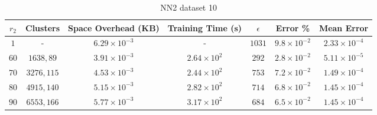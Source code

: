 \par\null\par
\par\null\par

\begin{adjustwidth}{-1cm}{}
\begin{table}
\caption{NN2 dataset 10}\label{ws210}
\begin{tabular}{ccccccc}
\hline
\toprule
$r_2$ & Clusters & Space Overhead (KB) & Training Time (s) & $\epsilon$ & Error \% & Mean Error\\
\midrule
$1$ & - & $6.29 \times 10^{-3}$ & - & $1031$ & $9.8 \times 10^{-2}$ & $2.33 \times 10^{-4}$\\
$60$ & $1638, 89$ & $3.91 \times 10^{-3}$ & $2.64 \times 10^2$ & $292$ & $2.8 \times 10^{-2}$ & $5.11 \times 10^{-5}$\\
$70$ & $3276, 115$ & $4.53 \times 10^{-3}$ & $2.44 \times 10^2$ & $753$ & $7.2 \times 10^{-2}$ & $1.49 \times 10^{-4}$\\
$80$ & $4915, 140$ & $5.15 \times 10^{-3}$ & $2.82 \times 10^2$ & $714$ & $6.8 \times 10^{-2}$ & $1.45 \times 10^{-4}$\\
$90$ & $6553, 166$ & $5.77 \times 10^{-3}$ & $3.17 \times 10^2$ & $684$ & $6.5 \times 10^{-2}$ & $1.45 \times 10^{-4}$\\
\bottomrule
\end{tabular}
\end{table}
\end{adjustwidth}

\par\null\par
\par\null\par

\pagebreak

